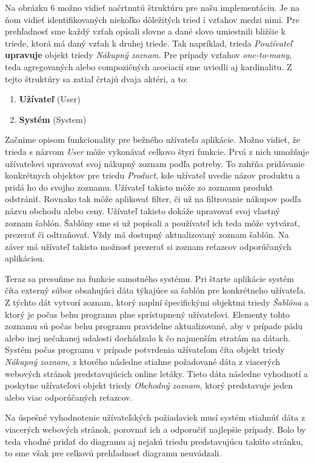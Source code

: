 \documentclass[twoside,slovak, a4paper]{article}
\begin{document}
Na obrázku 6 možno vidieť načrtnutú štruktúru pre našu implementáciu. Je na ňom vidieť identifikovaných niekoľko dôležitých tried i vzťahov medzi nimi. Pre prehľadnosť sme každý vzťah opísali slovne a dané slovo umiestnili bližšie k triede, ktorá má daný vzťah k druhej triede. Tak napríklad, trieda \textit{Používateľ} \textbf{upravuje} objekt triedy \textit{Nákupný zoznam}. Pre prípady vzťahov \textit{one-to-many}, teda agregovaných alebo compozičných asociacií sme uviedli aj kardinalitu. Z tejto štruktúry sa zatiaľ črtajú dvaja aktéri, a to:

\begin{enumerate}
    \item \textbf{Užívateľ} (User)
    \item \textbf{Systém} (System)
\end{enumerate}


Začnime opisom funkcionality pre bežného užívateľa aplikácie. Možno vidieť, že trieda s názvom \textit{User} môže vykonávať celkovo štyri funkcie. Prvá z nich umožňuje užívateľovi upravovať svoj nákupný zoznam podľa potreby. To zahŕňa pridávanie konkrétnych objektov pre triedu \textit{Product}, kde užívateľ uvedie názov produktu a pridá ho do svojho zoznamu. Užívateľ takisto môže zo zoznamu produkt odstrániť. Rovnako tak môže aplikovať filter, či už na filtrovanie nákupov podľa názvu obchodu alebo ceny. Užívateľ takisto dokáže upravovať svoj vlastný zoznam šablón. Šablóny sme si už popísali a používateľ ich teda môže vytvárať, prezerať či odtraňovať. Vždy má dostupný aktualizovaný zoznam šablón. Na záver má užívateľ takisto možnosť prezerať si zoznam reťazcov odporúčaných aplikáciou.

Teraz sa presuňme na funkcie samotného systému. Pri štarte aplikácie systém číta externý súbor obsahujúci dáta týkajúce sa šablón pre konkrétneho užívateľa. Z týchto dát vytvorí zoznam, ktorý naplní špecifickými objektmi triedy \textit{Šablóna} a ktorý je počas behu programu plne sprístupnený užívateľovi. Elementy tohto zoznamu sú počas behu programu pravidelne aktualizované, aby v prípade pádu alebo inej nečakanej udalosti dochádzalo k čo najmenším stratám na dátach. Systém počas programu v prípade potvrdenia užívateľom číta objekt triedy \textit{Nákupný zoznam}, z ktorého následne stiahne požadované dáta z viacerých webových stránok predstavujúcich online letáky. Tieto dáta následne vyhodnotí a poskytne užívateľovi objekt triedy \textit{Obchodný zoznam}, ktorý predstavuje jeden alebo viac odporúčaných reťazcov.

Na úspešné vyhodnotenie užívateľských požiadaviek musí systém stiahnúť dáta z viacerých webových stránok, porovnať ich a odporučiť najlepšie prípady. Bolo by teda vhodné pridať do diagramu aj nejakú triedu predstavujúcu takúto stránku, to sme však pre celkovú prehľadnosť diagramu neuvádzali.
\end{document}
